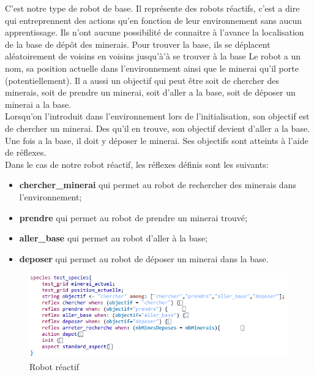 C’est notre type de robot de base. Il représente des robots réactifs, c’est a dire qui entreprennent des actions qu'en fonction de leur environnement sans aucun apprentissage.  Ils n’ont aucune possibilité de connaitre à l'avance la localisation de la base de dépôt des minerais. Pour trouver la base, ils se déplacent aléatoirement de voisins en voisins jusqu'à’à se trouver à la base Le robot a un nom, sa position actuelle dans l'environnement ainsi que le minerai qu'il porte (potentiellement). Il a aussi un objectif qui peut être soit de chercher des minerais, soit de prendre un minerai, soit d'aller a la base, soit de déposer un minerai a la base.\\
Lorsqu'on l'introduit dans l'environnement lors de l'initialisation, son objectif est de chercher un minerai. Des qu'il en trouve, son objectif devient d'aller a la base. Une fois a la base, il doit y déposer le minerai. Ses objectifs sont atteints à l'aide de réflexes\footnotemark.\\

Dans le cas de notre robot réactif, les réflexes définis sont les suivants:
\begin{itemize}
\item \textbf{chercher\_minerai} qui permet au robot de rechercher des minerais dans l'environnement;
\item \textbf{prendre} qui permet au robot de prendre un minerai trouvé;
\item \textbf{aller\_base} qui permet au robot d'aller à la base;
\item \textbf{deposer} qui permet au robot de déposer un minerai dans la base.
\end{itemize}

\begin{figure}[!h]
	\begin{center}
		\includegraphics{code/robot_reactif}
	\end{center}
	\caption{Robot réactif}
\end{figure}

